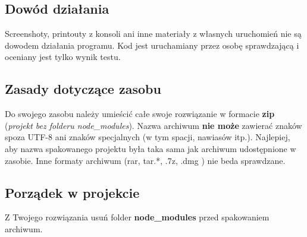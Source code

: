 \subsection*{Dowód działania}
Screenshoty, printouty z konsoli ani inne materiały z własnych uruchomień nie są dowodem działania programu.
Kod jest uruchamiany przez osobę sprawdzającą i oceniany jest tylko wynik testu.

\subsection*{Zasady dotyczące zasobu}
Do swojego zasobu należy umieścić całe swoje rozwiązanie w formacie \textbf{zip} (\textit{projekt bez folderu node\_modules}).
Nazwa archiwum \textbf{nie może} zawierać znaków spoza UTF-8 ani znaków specjalnych (w tym spacji, nawiasów itp.).
Najlepiej, aby nazwa spakowanego projektu była taka sama jak archiwum udostępnione w zasobie. Inne formaty archiwum (rar, tar.*, .7z, .dmg ) nie beda sprawdzane.

\subsection*{Porządek w projekcie}
Z Twojego rozwiązania usuń folder \textbf{node\_modules} przed spakowaniem archiwum.
